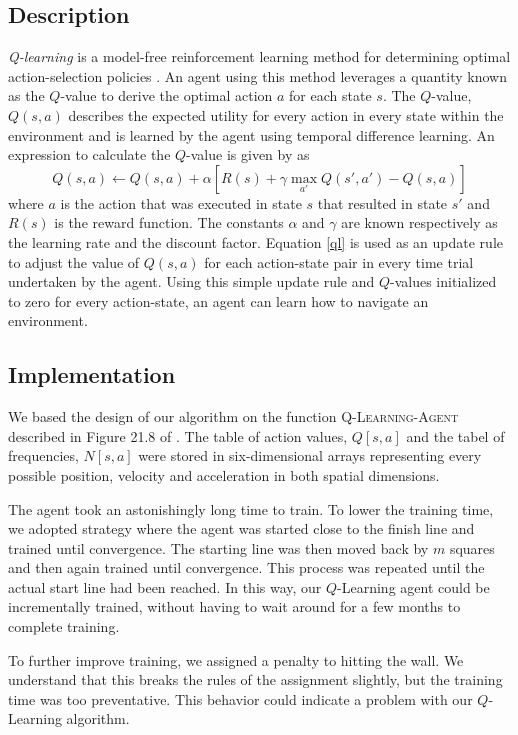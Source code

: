 \documentclass{article}
\begin{document}
		\subsection{Description}
			\textit{Q-learning} is a model-free reinforcement learning method for determining optimal action-selection policies \cite{ai}. An agent using this method leverages a quantity known as the $Q$-value to derive the optimal action $a$ for each state $s$. The $Q$-value, $Q(s,a)$ describes the expected utility for every action in every state within the environment and is learned by the agent using temporal difference learning.
			An expression to calculate the $Q$-value is given by \cite{ai} as
			\begin{equation}
				Q(s,a) \leftarrow Q(s,a) + \alpha \left[ R(s) + \gamma \max_{a'} Q(s',a') - Q(s,a) \right]
				\label{ql}
			\end{equation}
			where $a$ is the action that was executed in state $s$ that resulted in state $s'$ and $R(s)$ is the reward function. The constants $\alpha$ and $\gamma$ are known respectively as the learning rate and the discount factor. Equation \ref{ql} is used as an update rule to adjust the value of $Q(s,a)$ for each action-state pair in every time trial undertaken by the agent. Using this simple update rule and $Q$-values initialized to zero for every action-state, an agent can learn how to navigate an environment.
		\subsection{Implementation}
			We based the design of our algorithm on the function \textsc{Q-Learning-Agent} described in Figure 21.8 of \cite{ai}. 
			The table of action values, $Q[s,a]$ and the tabel of frequencies, $N[s,a]$ were stored in six-dimensional arrays representing every possible position, velocity and acceleration in both spatial dimensions.
			
			The agent took an astonishingly long time to train. To lower the training time, we adopted strategy where the agent was started close to the finish line and trained until convergence. The starting line was then moved back by $m$ squares and then again trained until convergence. This process was repeated until the actual start line had been reached. In this way, our $Q$-Learning agent could be incrementally trained, without having to wait around for a few months to complete training.
			
			To further improve training, we assigned a penalty to hitting the wall. We understand that this breaks the rules of the assignment slightly, but the training time was too preventative. This behavior could indicate a problem with our $Q$-Learning algorithm.
			
\end{document}
